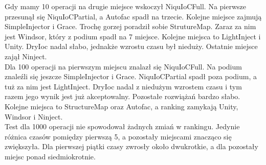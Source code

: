 \documentclass[12pt]{article}
\begin{document}
Gdy mamy 10 operacji na drugie miejsce wskoczył NiquIoCFull. Na pierwsze przesunął się NiquIoCPartial, a Autofac spadł na trzecie. Kolejne miejsce zajmują SimpleInjector i Grace. Trochę gorzej poradził sobie StrutureMap. Zaraz za nim jest Windsor, który z podium spadł na 7 miejsce. Kolejne miejsca to LightInject i Unity. DryIoc nadal słabo, jednakże wzrostu czasu był nieduży. Ostatnie miejsce zajął Ninject.\\
Dla 100 operacji na pierwszym miejscu znalazł się NiquIoCFull. Na podium znaleźli się jeszcze SimpleInjector i Grace. NiquIoCPartial spadł poza podium, a tuż za nim jest LightInject. DryIoc nadal z niedużym wzrostem czasu i tym razem jego wynik jest już akceptowalny. Pozostałe rozwiążań bardzo słabo. Kolejne miejsca to StructureMap oraz Autofac, a ranking zamykają Unity, Windsor i Ninject.\\
Test dla 1000 operacji nie spowodował żadnych zmiań w rankingu. Jedynie różnica czasów pomiędzy pierwszą 5, a pozostały miejscami znacząco się zwiększyła. Dla pierwszej piątki czasy zwrosły około dwukrotkie, a dla pozostały miejsc ponad siedmiokrotnie.
\end{document}
